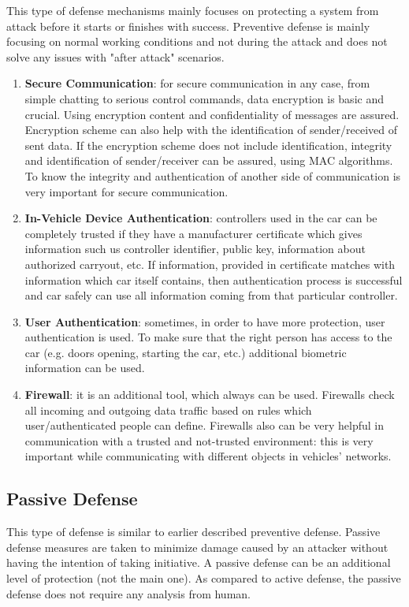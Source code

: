 This type of defense mechanisms mainly focuses on protecting a system from attack before it starts or finishes with success. Preventive defense is mainly focusing on normal working conditions and not during the attack and does not solve any issues with "after attack" scenarios.	
\begin{enumerate}
	\item \textbf{Secure Communication}: for secure communication in any case, from simple chatting to serious control commands, data encryption is basic and crucial. Using encryption content and confidentiality of messages are assured. Encryption scheme can also help with the identification of sender/received of sent data. If the encryption scheme does not include identification, integrity and identification of sender/receiver can be assured, using \gls{MAC} algorithms. To know the integrity and authentication of another side of communication is very important for secure communication.
	\item \textbf{In-Vehicle Device Authentication}: controllers used in the car can be completely trusted if they have a manufacturer certificate which gives information such us controller identifier, public key, information about authorized carryout, etc. If information, provided in certificate matches with information which car itself contains, then authentication process is successful and car safely can use all information coming from that particular controller.  
	\item \textbf{User Authentication}: sometimes, in order to have more protection, user authentication is used. To make sure that the right person has access to the car (e.g. doors opening, starting the car, etc.) additional biometric information can be used. 
	\item \textbf{Firewall}: it is an additional tool, which always can be used. Firewalls check all incoming and outgoing data traffic based on rules which user/authenticated people can define. Firewalls also can be very helpful in communication with a trusted and not-trusted environment: this is very important while communicating with different objects in vehicles' networks.
		\end{enumerate}
		
\subsection{Passive Defense}
This type of defense is similar to earlier described preventive defense. Passive defense measures are taken to minimize damage caused by an attacker without having the intention of taking initiative. A passive defense can be an additional level of protection (not the main one). As compared to active defense, the passive defense does not require any analysis from human.

